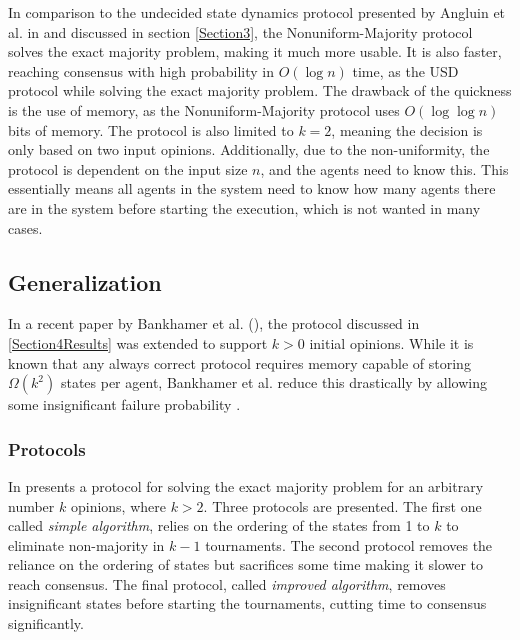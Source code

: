 In comparison to the undecided state dynamics protocol presented by Angluin et al. in \cite{angluinSimplePopulationProtocol2008} and discussed in section \ref{Section3}, the Nonuniform-Majority protocol solves the exact majority problem, making it much more usable. It is also faster, reaching consensus with high probability in $O(\log n)$ time, as the USD protocol while solving the exact majority problem. The drawback of the quickness is the use of memory, as the Nonuniform-Majority protocol uses $O(\log \log n)$ bits of memory.  The protocol is also limited to $k = 2$, meaning the decision is only based on two input opinions. 
Additionally, due to the non-uniformity, the protocol is dependent on the input size $n$, and the agents need to know this. This essentially means all agents in the system need to know how many agents there are in the system before starting the execution, which is not wanted in many cases. 


\subsection{Generalization}

In a recent paper by Bankhamer et al. (\cite{bankhamerPopulationProtocolsExact2022}), the protocol discussed in \ref{Section4Results} was extended to support $k > 0$ initial opinions.
While it is known that any always correct protocol requires memory capable of storing $\Omega(k^2)$ states per agent, Bankhamer et al. reduce this drastically by allowing some insignificant failure probability \cite{ongaroSearchUnderstandableConsensus}. 

\subsubsection{Protocols} \label{441}

In \cite{bankhamerPopulationProtocolsExact2022} presents a protocol for solving the exact majority problem for an arbitrary number $k$ opinions, where $k > 2$. Three protocols are presented. The first one called \emph{simple algorithm}, relies on the ordering of the states from 1 to $k$ to eliminate non-majority in $k-1$ tournaments. The second protocol removes the reliance on the ordering of states but sacrifices some time making it slower to reach consensus. The final protocol, called \emph{improved algorithm}, removes insignificant states before starting the tournaments, cutting time to consensus significantly. 

